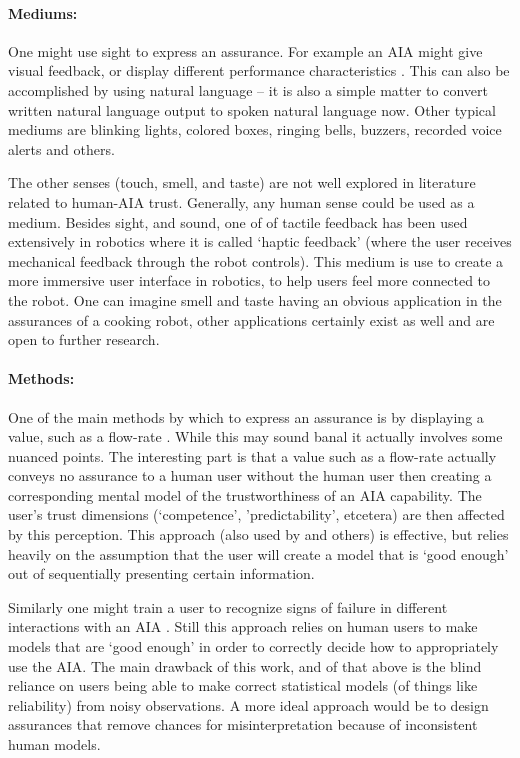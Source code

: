     \paragraph{Mediums:} One might use sight to express an assurance. For example an AIA might give visual feedback, or display different performance characteristics \cite{Chadalavada2015-wx,Muir1996-gt}. This can also be accomplished by using natural language \cite{Wang2016-id} -- it is also a simple matter to convert written natural language output to spoken natural language now. Other typical mediums are blinking lights, colored boxes, ringing bells, buzzers, recorded voice alerts and others.
    
    The other senses (touch, smell, and taste) are not well explored in literature related to human-AIA trust. Generally, any human sense could be used as a medium. Besides sight, and sound, one of of tactile feedback has been used extensively in robotics where it is called `haptic feedback' (where the user receives mechanical feedback through the robot controls). This medium is use to create a more immersive user interface in robotics, to help users feel more connected to the robot. One can imagine smell and taste having an obvious application in the assurances of a cooking robot, other applications certainly exist as well and are open to further research.

    \paragraph{Methods:} One of the main methods by which to express an assurance is by displaying a value, such as a flow-rate \cite{Muir1996-gt}. While this may sound banal it actually involves some nuanced points. The interesting part is that a value such as a flow-rate actually conveys no assurance to a human user without the human user then creating a corresponding mental model of the trustworthiness of an AIA capability. The user's trust dimensions (`competence', 'predictability', etcetera) are then affected by this perception. This approach (also used by \cite{Wickens1999-la,Sheridan1984-kx,Hutchins2015-if} and others) is effective, but relies heavily on the assumption that the user will create a model that is `good enough' out of sequentially presenting certain information.

    Similarly one might train a user to recognize signs of failure in different interactions with an AIA \cite{Freedy2007-sg,Desai2012-rc,Salem2015-md}. Still this approach relies on human users to make models that are `good enough' in order to correctly decide how to appropriately use the AIA. The main drawback of this work, and of that above is the blind reliance on users being able to make correct statistical models (of things like reliability) from noisy observations. A more ideal approach would be to design assurances that remove chances for misinterpretation because of inconsistent human models.

